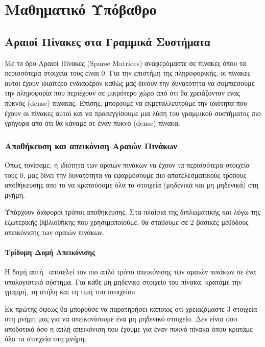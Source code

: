 \chapter{Μαθηματικό Υπόβαθρο}
\label{ch:3.chapterMathBackground}

\section{Αραιοί Πίνακες στα Γραμμικά Συστήματα}

Με το όρο Αραιοί Πίνακες \textlatin{(Sparse Matrices)} αναφερόμαστε σε πίνακες όπου τα περισσότερα στοιχεία τους είναι 0. Για την επιστήμη της πληροφορικής, οι πίνακες αυτοί έχουν ιδιαίτερο ενδιαφέρον καθώς μας δίνουν την δυνατότητα να συμπιέσουμε την πληροφορία που περιέχουν σε μικρότερο χώρο από ότι θα χρειάζονταν ένας πυκνός \textlatin{(dense)} πίνακας. Επίσης, μπορούμε να εκμεταλλευτούμε την ιδιότητα που έχουν οι πίνακες αυτοί και να προσεγγίσουμε μια λύση του γραμμικού συστήματος πιο γρήγορα απο ότι θα κάναμε σε έναν πυκνό \textlatin{(dense)} πίνακα.

\subsection{Αποθήκευση και απεικόνιση Αραιών Πινάκων}

Όπως τονίσαμε, η ιδιότητα των αραιών πινάκων να έχουν τα περισσότερα στοιχεία τους 0, μας δίνει την δυνατότητα να εφαρμόσουμε πιο αποτελεσματικούς τρόπους αποθήκευσης απο το να κρατούσαμε όλα τα στοιχεία (μηδενικά και μη μηδενικά) στη μνήμη.

Ύπάρχουν διάφοροι τρόποι αποθήκευσης. Στα πλαίσια της διπλωματικής και λόγω της εξωτερικής βιβλιοθήκης που χρησιμοποιούμε, θα σταθούμε σε 2 βασικές μεθόδους απεικόνισης των αραιών πινάκων.

\subsubsection{Τρίδυμη Δομή Απεικόνισης} \label{TripletForm}
Η δομή αυτή~\cite{davis2006direct} αποτελεί τον πιο απλό τρόπο απεικόνισης των αραιών πινάκων σε ένα υπολογιστικό σύστημα. Για κάθε μη μηδενικο στοιχείο του πίνακα, κρατάμε την γραμμή, τη στήλη και τη τιμή του στοιχείου.

Εκ πρώτης όψεως θα μπορούσε να παρατηρήσει κάποιος οτι χρειαζόμαστε 3 στοιχεία στη μνήμη μας για να απεικονίσουμε ένα μη μηδενικό στοιχείο. Δεν είναι όσο αποδοτικό όσο η απλή απεικόνιση που έχουμε για έναν πυκνό πίνακα όπου κρατάμε όλα τα στοιχεία στη μνήμη.

